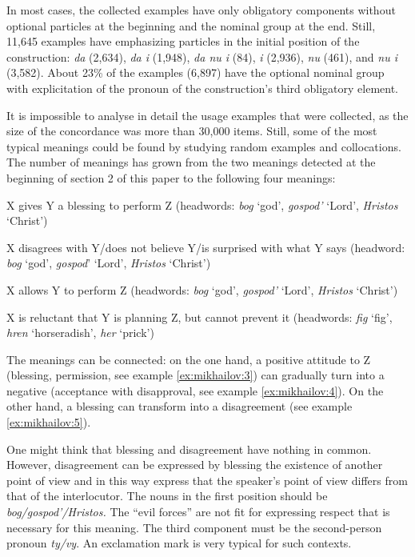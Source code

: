 \documentclass[output=paper]{langscibook}
\begin{document}
In most cases, the collected examples have only obligatory components without optional particles at the beginning and the nominal group at the end. Still, 11,645 examples have emphasizing particles in the initial position of the construction: \textit{da} (2,634), \textit{da i} (1,948), \textit{da nu i} (84), \textit{i} (2,936), \textit{nu} (461), and \textit{nu i} (3,582). About 23\% of the examples (6,897) have the optional nominal group with explicitation of the pronoun of the construction’s third obligatory element.

It is impossible to analyse in detail the usage examples that were collected, as the size of the concordance was more than 30,000 items. Still, some of the most typical meanings could be found by studying random examples and collocations. The number of meanings has grown from the two meanings detected at the beginning of section 2 of this paper to the following four meanings:

\begin{description}\sloppy
\item [Blessing:] X gives Y a blessing to perform Z (headwords: \textit{bog} ‘god’, \textit{gospod’} ‘Lord’, \textit{Hristos} ‘Christ’)
\item [Disagreement, disbelief, surprise:] X disagrees with Y\slash does not believe Y\slash is surprised with what Y says (headword: \textit{bog} ‘god’, \textit{gospod}’ ‘Lord’, \textit{Hristos} ‘Christ’)
\item [Permission:] X allows Y to perform Z (headwords: \textit{bog} ‘god’, \textit{gospod’} ‘Lord’, \textit{Hristos} ‘Christ’)
\item [Acceptance with disapproval:] X is reluctant that Y is planning Z, but cannot prevent it (headwords: \textit{fig} ‘fig’, \textit{hren} ‘horseradish’, \textit{her} ‘prick’)
\end{description}

The meanings can be connected: on the one hand, a positive attitude to Z (blessing, permission, see example \ref{ex:mikhailov:3}) can gradually turn into a negative (acceptance with disapproval, see example \ref{ex:mikhailov:4}). On the other hand, a blessing can transform into a disagreement (see example \ref{ex:mikhailov:5}).

One might think that blessing and disagreement have nothing in common. However, disagreement can be expressed by blessing the existence of another point of view and in this way express that the speaker’s point of view differs from that of the interlocutor. The nouns in the first position should be \textit{bog/gospod’/Hristos.} The “evil forces” are not fit for expressing respect that is necessary for this meaning. The third component must be the second-person pronoun \textit{ty/vy}. An exclamation mark is very typical for such contexts.
\end{document}
